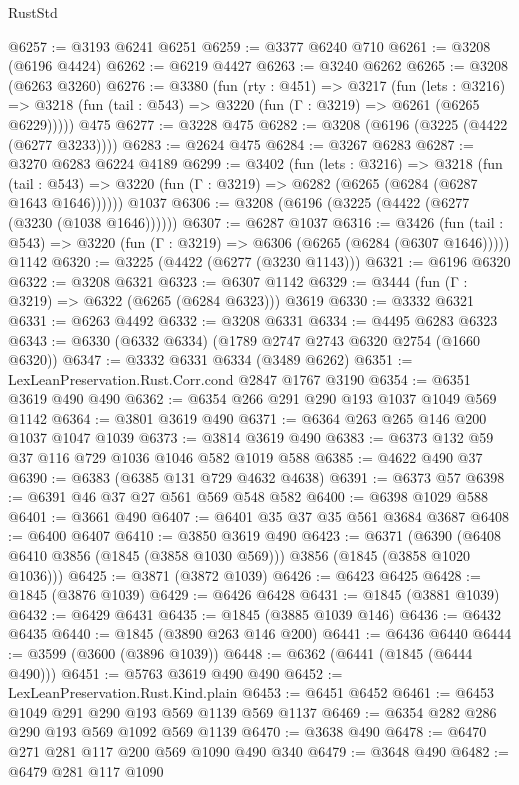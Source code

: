 \begin{lexlean}{RustStd}
\begin{coremodule}
@6257 := @3193 @6241 @6251
@6259 := @3377 @6240 @710
@6261 := @3208 (@6196 @4424)
@6262 := @6219 @4427
@6263 := @3240 @6262
@6265 := @3208 (@6263 @3260)
@6276 := @3380
    (fun (rty : @451) =>
    @3217
      (fun (lets : @3216) =>
      @3218 (fun (tail : @543) => @3220 (fun (Γ : @3219) => @6261 (@6265 @6229)))))
    @475
@6277 := @3228 @475
@6282 := @3208 (@6196 (@3225 (@4422 (@6277 @3233))))
@6283 := @2624 @475
@6284 := @3267 @6283
@6287 := @3270 @6283 @6224 @4189
@6299 := @3402
    (fun (lets : @3216) =>
    @3218
      (fun (tail : @543) => @3220 (fun (Γ : @3219) => @6282 (@6265 (@6284 (@6287 @1643 @1646))))))
    @1037
@6306 := @3208 (@6196 (@3225 (@4422 (@6277 (@3230 (@1038 @1646))))))
@6307 := @6287 @1037
@6316 := @3426
    (fun (tail : @543) => @3220 (fun (Γ : @3219) => @6306 (@6265 (@6284 (@6307 @1646)))))
    @1142
@6320 := @3225 (@4422 (@6277 (@3230 @1143)))
@6321 := @6196 @6320
@6322 := @3208 @6321
@6323 := @6307 @1142
@6329 := @3444 (fun (Γ : @3219) => @6322 (@6265 (@6284 @6323))) @3619
@6330 := @3332 @6321
@6331 := @6263 @4492
@6332 := @3208 @6331
@6334 := @4495 @6283 @6323
@6343 := @6330 (@6332 @6334) (@1789 @2747 @2743 @6320 @2754 (@1660 @6320))
@6347 := @3332 @6331 @6334 (@3489 @6262)
@6351 := LexLeanPreservation.Rust.Corr.cond @2847 @1767 @3190
@6354 := @6351 @3619 @490 @490
@6362 := @6354 @266 @291 @290 @193 @1037 @1049 @569 @1142
@6364 := @3801 @3619 @490
@6371 := @6364 @263 @265 @146 @200 @1037 @1047 @1039
@6373 := @3814 @3619 @490
@6383 := @6373 @132 @59 @37 @116 @729 @1036 @1046 @582 @1019 @588
@6385 := @4622 @490 @37
@6390 := @6383 (@6385 @131 @729 @4632 @4638)
@6391 := @6373 @57
@6398 := @6391 @46 @37 @27 @561 @569 @548 @582
@6400 := @6398 @1029 @588
@6401 := @3661 @490
@6407 := @6401 @35 @37 @35 @561 @3684 @3687
@6408 := @6400 @6407
@6410 := @3850 @3619 @490
@6423 := @6371
    (@6390 (@6408 @6410 @3856 (@1845 (@3858 @1030 @569))) @3856 (@1845 (@3858 @1020 @1036)))
@6425 := @3871 (@3872 @1039)
@6426 := @6423 @6425
@6428 := @1845 (@3876 @1039)
@6429 := @6426 @6428
@6431 := @1845 (@3881 @1039)
@6432 := @6429 @6431
@6435 := @1845 (@3885 @1039 @146)
@6436 := @6432 @6435
@6440 := @1845 (@3890 @263 @146 @200)
@6441 := @6436 @6440
@6444 := @3599 (@3600 (@3896 @1039))
@6448 := @6362 (@6441 (@1845 (@6444 @490)))
@6451 := @5763 @3619 @490 @490
@6452 := LexLeanPreservation.Rust.Kind.plain
@6453 := @6451 @6452
@6461 := @6453 @1049 @291 @290 @193 @569 @1139 @569 @1137
@6469 := @6354 @282 @286 @290 @193 @569 @1092 @569 @1139
@6470 := @3638 @490
@6478 := @6470 @271 @281 @117 @200 @569 @1090 @490 @340
@6479 := @3648 @490
@6482 := @6479 @281 @117 @1090

\end{coremodule}
\end{lexlean}
